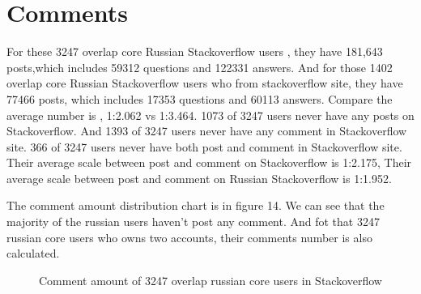 \documentclass[A4paper,twoside,twocolumn]{article}
\begin{document}
\section{Comments}

For these 3247 overlap core Russian Stackoverflow users , they have 181,643 posts,which includes 59312 questions and 122331 answers. And for those 1402 overlap core Russian Stackoverflow users who from stackoverflow site, they have 77466 posts, which includes 17353 questions and 60113 answers. Compare the average number is , 1:2.062 vs 1:3.464. 1073 of 3247 users never have any posts on Stackoverflow. And 1393 of 3247 users never have any comment in Stackoverflow site. 366 of 3247 users never have both post and comment in Stackoverflow site. Their average scale between post and comment on Stackoverflow is 1:2.175, Their average scale between post and comment on Russian Stackoverflow is 1:1.952.

The comment amount distribution chart is in figure 14. We can see that the majority of the russian users haven't post any comment. And fot that 3247 russian core users who owns two accounts, their comments number is also calculated.
\begin{figure}[H]
	\centering 
	\caption{Comment amount of 3247 overlap russian core users in Stackoverflow}		
\end{figure}
\end{document}
